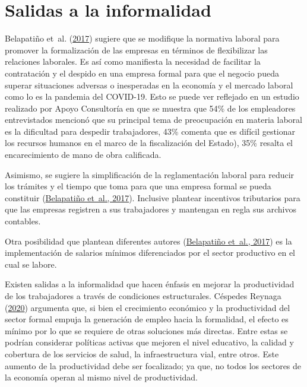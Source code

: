 \documentclass[
  letterpaper,
  12pt,
  oneside,
  spanish,
  doublespacing,
  headsepline,
  parskip]{MastersDoctoralThesis}
\begin{document}
\hypertarget{salidas-a-la-informalidad}{%
\section{Salidas a la informalidad}\label{salidas-a-la-informalidad}}

Belapatiño et~al. (\protect\hyperlink{ref-belapatiuxf1o2017}{2017})
sugiere que se modifique la normativa laboral para promover la
formalización de las empresas en términos de flexibilizar las relaciones
laborales. Es así como manifiesta la necesidad de facilitar la
contratación y el despido en una empresa formal para que el negocio
pueda superar situaciones adversas o inesperadas en la economía y el
mercado laboral como lo es la pandemia del COVID-19. Esto se puede ver
reflejado en un estudio realizado por Apoyo Consultoría en que se
muestra que 54\% de los empleadores entrevistados mencionó que su
principal tema de preocupación en materia laboral es la dificultad para
despedir trabajadores, 43\% comenta que es difícil gestionar los
recursos humanos en el marco de la fiscalización del Estado), 35\%
resalta el encarecimiento de mano de obra calificada.

Asimismo, se sugiere la simplificación de la reglamentación laboral para
reducir los trámites y el tiempo que toma para que una empresa formal se
pueda constituir (\protect\hyperlink{ref-belapatiuxf1o2017}{Belapatiño
et~al., 2017}). Inclusive plantear incentivos tributarios para que las
empresas registren a sus trabajadores y mantengan en regla sus archivos
contables.

Otra posibilidad que plantean diferentes autores
(\protect\hyperlink{ref-belapatiuxf1o2017}{Belapatiño et~al., 2017}) es
la implementación de salarios mínimos diferenciados por el sector
productivo en el cual se labore.

Existen salidas a la informalidad que hacen énfasis en mejorar la
productividad de los trabajadores a través de condiciones estructurales.
Céspedes Reynaga (\protect\hyperlink{ref-cuxe9spedesreynaga2020}{2020})
argumenta que, si bien el crecimiento económico y la productividad del
sector formal empuja la generación de empleo hacia la formalidad, el
efecto es mínimo por lo que se requiere de otras soluciones más
directas. Entre estas se podrían considerar políticas activas que
mejoren el nivel educativo, la calidad y cobertura de los servicios de
salud, la infraestructura vial, entre otros. Este aumento de la
productividad debe ser focalizado; ya que, no todos los sectores de la
economía operan al mismo nivel de productividad.
\end{document}
